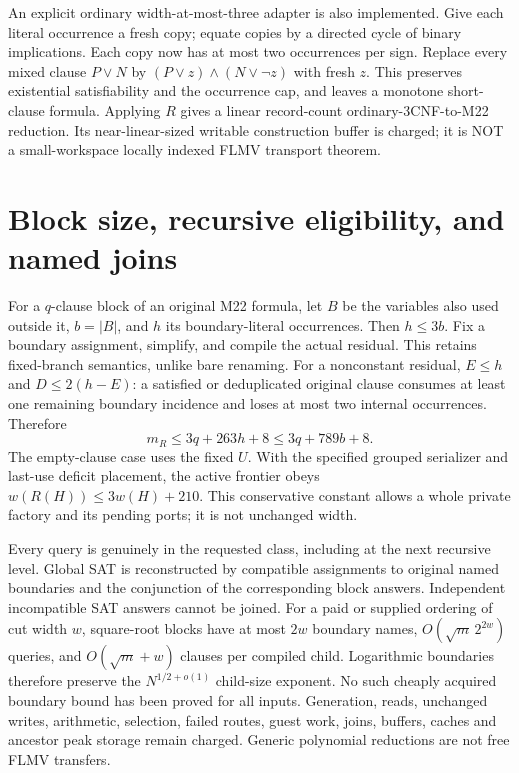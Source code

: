 \documentclass[11pt]{article}
\begin{document}
An explicit ordinary width-at-most-three adapter is also implemented.
Give each literal occurrence a fresh copy; equate copies by a directed
cycle of binary implications. Each copy now has at most two occurrences
per sign. Replace every mixed clause \(P\vee N\) by
\((P\vee z)\land(N\vee\neg z)\) with fresh \(z\). This preserves existential
satisfiability and the occurrence cap, and leaves a monotone short-clause
formula. Applying \(R\) gives a linear record-count ordinary-3CNF-to-M22
reduction. Its near-linear-sized writable construction buffer is charged;
it is NOT a small-workspace locally indexed FLMV transport theorem.

\section{Block size, recursive eligibility, and named joins}
For a \(q\)-clause block of an original M22 formula, let \(B\) be the variables
also used outside it, \(b=|B|\), and \(h\) its boundary-literal occurrences.
Then \(h\le3b\). Fix a boundary assignment, simplify, and compile the actual
residual. This retains fixed-branch semantics, unlike bare renaming.
For a nonconstant residual, \(E\le h\) and \(D\le2(h-E)\): a satisfied or
deduplicated original clause consumes at least one remaining boundary
incidence and loses at most two internal occurrences. Therefore
\[
 m_R\le3q+263h+8\le3q+789b+8.
\]
The empty-clause case uses the fixed \(U\). With the specified grouped
serializer and last-use deficit placement, the active frontier obeys
\(w(R(H))\le3w(H)+210\). This conservative constant allows a whole private
factory and its pending ports; it is not unchanged width.

Every query is genuinely in the requested class, including at the next
recursive level. Global SAT is reconstructed by compatible assignments to
original named boundaries and the conjunction of the corresponding block
answers. Independent incompatible SAT answers cannot be joined.
For a paid or supplied ordering of cut width \(w\), square-root blocks have
at most \(2w\) boundary names, \(O(\sqrt m\,2^{2w})\) queries, and
\(O(\sqrt m+w)\) clauses per compiled child. Logarithmic boundaries therefore
preserve the \(N^{1/2+o(1)}\) child-size exponent. No such cheaply acquired
boundary bound has been proved for all inputs. Generation, reads, unchanged
writes, arithmetic, selection, failed routes, guest work, joins, buffers,
caches and ancestor peak storage remain charged. Generic polynomial
reductions are not free FLMV transfers.
\end{document}
